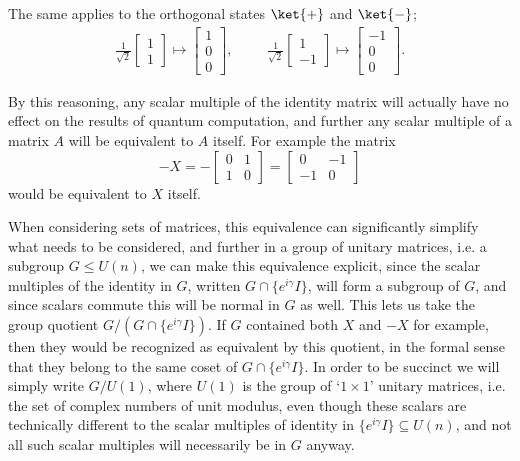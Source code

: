 The same applies to the orthogonal states $\ket{+}$ and $\ket{-}$;
\begin{align*}
	\frac{1}{\sqrt{2}}\begin{bmatrix}1 \\ 1\end{bmatrix} \mapsto \begin{bmatrix}1\\0\\0\end{bmatrix},
	&&&
	\frac{1}{\sqrt{2}}\begin{bmatrix}1 \\ -1\end{bmatrix} \mapsto \begin{bmatrix}-1\\0\\0\end{bmatrix}.
\end{align*}

By this reasoning, any scalar multiple of the identity matrix will actually have no effect on the results of quantum computation, and further any scalar multiple of a matrix $A$ will be equivalent to $A$ itself. For example the matrix
\[-X = -\left[\begin{matrix}0 & 1 \\ 1 & 0\end{matrix}\right]= \left[\begin{matrix}0 & -1 \\ -1 & 0\end{matrix}\right]\]
would be equivalent to $X$ itself.

When considering sets of matrices, this equivalence can significantly simplify what needs to be considered, and further in a group of unitary matrices, i.e. a subgroup $G \leq U(n)$, we can make this equivalence explicit, since the scalar multiples of the identity in $G$, written $G \cap \{e^{i\gamma}I\}$, will form a subgroup of $G$, and since scalars commute this will be normal in $G$ as well. This lets us take the group quotient $G / (G \cap \{e^{i\gamma}I\})$. If $G$ contained both $X$ and $-X$ for example, then they would be recognized as equivalent by this quotient, in the formal sense that they belong to the same coset of $G \cap \{e^{i\gamma}I\}$. In order to be succinct we will simply write $G / U(1)$, where $U(1)$ is the group of `$1 \times 1$' unitary matrices, i.e. the set of complex numbers of unit modulus, even though these scalars are technically different to the scalar multiples of identity in $\{e^{i\gamma}I\} \subseteq U(n)$, and not all such scalar multiples will necessarily be in $G$ anyway.

